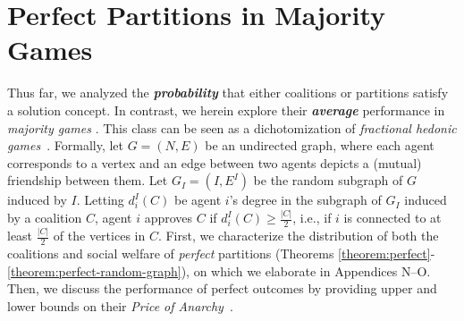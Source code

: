 \documentclass[letterpaper]{article}
\begin{document}
\section{Perfect Partitions in Majority Games}
\label{sec:Perfect Partitions in Majority Games}
Thus far, we analyzed the \textit{\textbf{probability}} that either coalitions or partitions satisfy a solution concept. In contrast, we herein explore their \textit{\textbf{average}} performance in \textit{majority games} \cite{peters2016complexity}. This class can be seen as a dichotomization of \textit{fractional hedonic games}~\cite{aziz2019fractional}. Formally, let $G = (N, E)$ be an undirected graph, where each agent corresponds to a vertex and an edge between two agents depicts a (mutual) friendship between them. Let $G_I = (I, E^I)$ be the random subgraph of $G$ induced by $I$. Letting $d_i^I(C)$ be agent $i$'s degree in the subgraph of $G_I$ induced by a coalition $C$, agent $i$ approves $C$ if $d_i^I(C) \geq \frac{|C|}{2}$, i.e., if $i$ is connected to at least $\frac{|C|}{2}$ of the vertices in $C$. First, we characterize the distribution of both the coalitions and social welfare of \textit{perfect} partitions (Theorems \ref{theorem:perfect}-\ref{theorem:perfect-random-graph}), on which we elaborate in Appendices N--O. Then, we discuss the performance of perfect outcomes by providing upper and lower bounds on their \textit{Price of Anarchy}~\cite{koutsoupias1999worst}.
\end{document}
